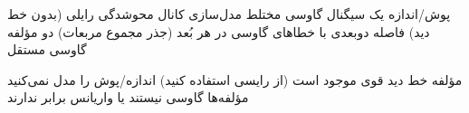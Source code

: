 
\lr{\mbox{\PSyes{}}} پوش/اندازه یک سیگنال گاوسی مختلط\PSbr{}\lr{\mbox{\PSyes{}}} مدل‌سازی کانال محوشدگی رایلی (بدون خط دید)\PSbr{}\lr{\mbox{\PSyes{}}} فاصله دوبعدی با خطاهای گاوسی در هر بُعد\PSbr{} (جذر مجموع مربعات) دو مؤلفه گاوسی مستقل


\lr{\mbox{\PSno{}}} مؤلفه خط دید قوی موجود است (از رایسی استفاده کنید)\PSbr{}\lr{\mbox{\PSno{}}} اندازه/پوش را مدل نمی‌کنید\PSbr{}\lr{\mbox{\PSno{}}} مؤلفه‌ها گاوسی نیستند یا واریانس برابر ندارند



\begin{Shaded}
\begin{Highlighting}[]
 \OperatorTok{=} \OperatorTok{;}   
 \OperatorTok{=} \NormalTok{(}\OperatorTok{,} \OperatorTok{,} \NormalTok{)}\OperatorTok{;}

 \OperatorTok{=} \NormalTok{(}\OperatorTok{,} \NormalTok{)}\OperatorTok{;}
 \OperatorTok{=} \NormalTok{(}\OperatorTok{,} \NormalTok{)}\OperatorTok{;}

\OperatorTok{;}
\NormalTok{(}\OperatorTok{,}\OperatorTok{,}\NormalTok{)}\OperatorTok{;}
\NormalTok{(}\OperatorTok{,} \OperatorTok{,} \OperatorTok{,} \OperatorTok{,} \NormalTok{)}\OperatorTok{;}
\NormalTok{(}\NormalTok{)}\OperatorTok{;} \NormalTok{(}\NormalTok{)}\OperatorTok{;}
\NormalTok{(}\NormalTok{(}\OperatorTok{,} \NormalTok{))}\OperatorTok{;}
 \OperatorTok{;}


\end{Highlighting}
\end{Shaded}
